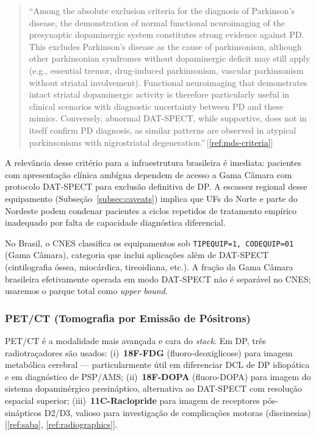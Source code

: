 \documentclass[12pt,a4paper,oneside]{article}
\begin{document}
\begin{quotation}
\noindent\small
``Among the absolute exclusion criteria for the diagnosis of
Parkinson's disease, the demonstration of normal functional
neuroimaging of the presynaptic dopaminergic system constitutes
strong evidence against PD. This excludes Parkinson's disease as
the cause of parkinsonism, although other parkinsonian syndromes
without dopaminergic deficit may still apply (e.g., essential
tremor, drug-induced parkinsonism, vascular parkinsonism without
striatal involvement). Functional neuroimaging that demonstrates
intact striatal dopaminergic activity is therefore particularly
useful in clinical scenarios with diagnostic uncertainty between PD
and these mimics. Conversely, abnormal DAT-SPECT, while supportive,
does not in itself confirm PD diagnosis, as similar patterns are
observed in atypical parkinsonisms with nigrostriatal
degeneration.''\,[\ref{ref:mds-criteria}]
\end{quotation}

A relevância desse critério para a infraestrutura brasileira é
imediata: pacientes com apresentação clínica ambígua dependem de
acesso a Gama Câmara com protocolo DAT-SPECT para exclusão definitiva
de DP. A escassez regional desse equipamento (Subseção~\ref{subsec:caveats})
implica que UFs do Norte e parte do Nordeste podem condenar
pacientes a ciclos repetidos de tratamento empírico inadequado por
falta de capacidade diagnóstica diferencial.

No Brasil, o CNES classifica os equipamentos sob
\texttt{TIPEQUIP=1, CODEQUIP=01} (Gama Câmara), categoria que
inclui aplicações além de DAT-SPECT (cintilografia óssea,
miocárdica, tireoidiana, etc.). A fração da Gama Câmara
brasileira efetivamente operada em modo DAT-SPECT não é separável
no CNES; usaremos o parque total como \textit{upper bound}.

\subsubsection{PET/CT (Tomografia por Emissão de Pósitrons)}

PET/CT é a modalidade mais avançada e cara do \textit{stack}. Em
DP, três radiotraçadores são usados:
(i)~\textbf{18F-FDG} (fluoro-deoxiglicose) para imagem metabólica
cerebral — particularmente útil em diferenciar DCL de DP idiopática
e em diagnóstico de PSP/AMS;
(ii)~\textbf{18F-DOPA} (fluoro-DOPA) para imagem do sistema
dopaminérgico presináptico, alternativa ao DAT-SPECT com resolução
espacial superior;
(iii)~\textbf{11C-Raclopride} para imagem de receptores
pós-sinápticos D2/D3, valioso para investigação de complicações
motoras (discinesias)\,[\ref{ref:saba}, \ref{ref:radiographics}].
\end{document}
